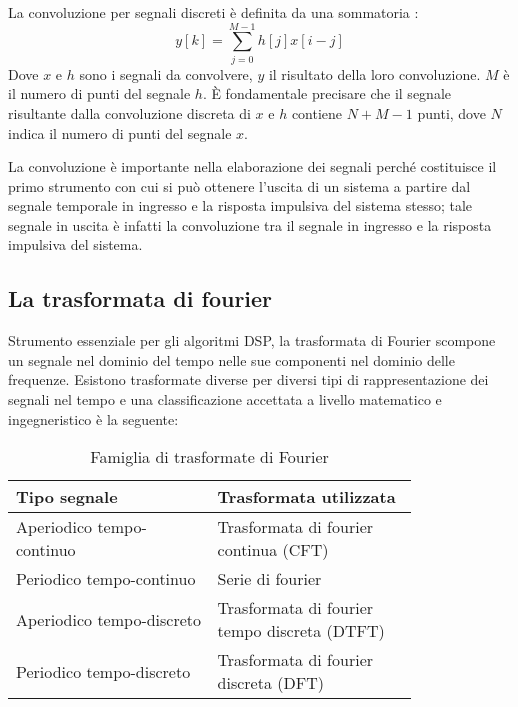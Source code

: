 La convoluzione per segnali discreti è definita da una sommatoria \cite[p.~120]{dspguide}:
\begin{equation}
    y[k] = \displaystyle\sum_{j=0}^{M-1}h[j]x[i-j]
\end{equation}
Dove $x$ e $h$ sono i segnali da convolvere, $y$ il risultato della loro convoluzione. $M$ è il numero di punti del segnale $h$. È fondamentale precisare che il segnale risultante dalla convoluzione discreta di $x$ e $h$ contiene $N+M-1$ punti, dove $N$ indica il numero di punti del segnale $x$.

La convoluzione è importante nella elaborazione dei segnali perché costituisce il primo strumento con cui si può ottenere l'uscita di un sistema a partire dal segnale temporale in ingresso e la risposta impulsiva del sistema stesso; tale segnale in uscita è infatti la convoluzione tra il segnale in ingresso e la risposta impulsiva del sistema.

\subsection{La trasformata di fourier}
Strumento essenziale per gli algoritmi DSP, la trasformata di Fourier scompone un segnale nel dominio del tempo nelle sue componenti nel dominio delle frequenze. Esistono trasformate diverse per diversi tipi di rappresentazione dei segnali nel tempo e una classificazione accettata a livello matematico e ingegneristico \cite[p.~144]{dspguide} è la seguente:

\begin{table}[H]
\begin{center}
\begin{small}
\begin{tabular}{p{0.4\linewidth} p{0.4\linewidth}}
    Tipo segnale & Trasformata utilizzata \\
    \hline
    Aperiodico tempo-continuo & Trasformata di fourier continua (CFT) \\
    Periodico tempo-continuo & Serie di fourier \\
    Aperiodico tempo-discreto & Trasformata di fourier tempo discreta (DTFT) \\
    Periodico tempo-discreto & Trasformata di fourier discreta (DFT)
\end{tabular}
\end{small}
\end{center}
\caption{Famiglia di trasformate di Fourier}
\end{table}

